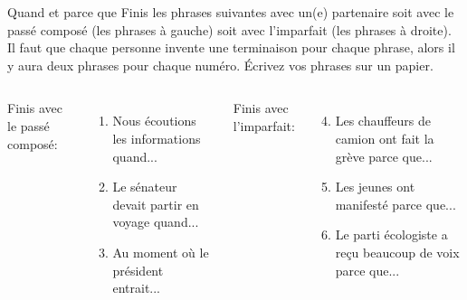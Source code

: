\begin{frame}{Quand et parce que}
  Finis les phrases suivantes avec un(e) partenaire soit avec le passé composé (les phrases à gauche) soit avec l'imparfait (les phrases à droite).
  Il faut que chaque personne invente une terminaison pour chaque phrase, alors il y aura \alert{deux} phrases pour chaque numéro.
  Écrivez vos phrases sur un papier.
  \vspace{0.25cm}
  \begin{columns}
      Finis avec le passé composé:
      \begin{enumerate}
        \item Nous écoutions les informations quand...
        \item Le sénateur devait partir en voyage quand...
        \item Au moment où le président entrait...
      \end{enumerate}
      Finis avec l'imparfait:
      \begin{enumerate}
        \setcounter{enumi}{3}
        \item Les chauffeurs de camion ont fait la grève parce que...
        \item Les jeunes ont manifesté parce que...
        \item Le parti écologiste a reçu beaucoup de voix parce que...
      \end{enumerate}
  \end{columns}
\end{frame}